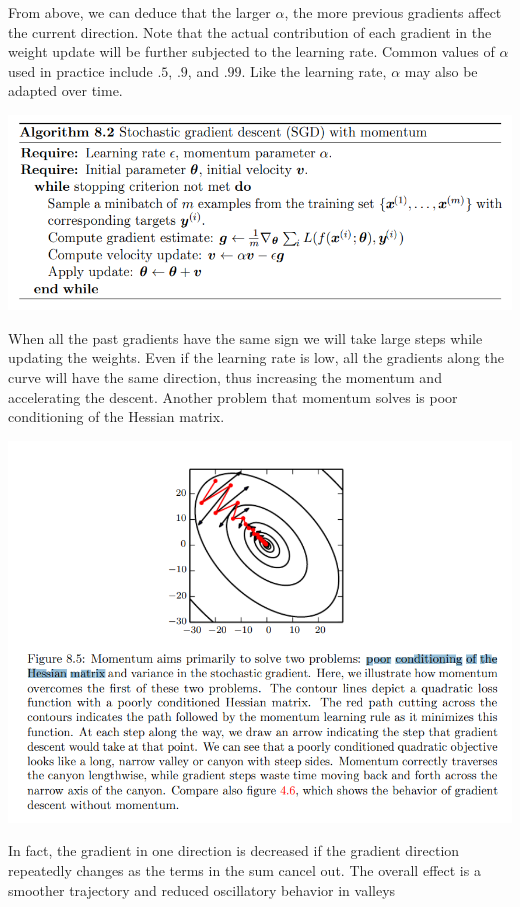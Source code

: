 From above, we can deduce that the larger $\alpha$, the more previous gradients affect the current direction. Note that the actual contribution of each gradient in the weight update will be further subjected to the learning rate.\newline\newline
Common values of $\alpha$ used in practice include $.5$, $.9$, and $.99$. Like the learning rate, $\alpha$ may also be adapted over time.
\begin{center}
    \includegraphics[]{images/Momentum alg.png}
\end{center}
When all the past gradients have the same sign we will take large steps while updating the weights. Even if the learning rate is low, all the gradients along the curve will have the same direction, thus increasing the momentum and accelerating the descent.\newline\newline
Another problem that momentum solves is poor conditioning of the Hessian matrix.
\begin{center}
    \includegraphics[]{images/poor cond. momentum.png}
\end{center}
In fact, the gradient in one direction is decreased if the gradient direction repeatedly changes as the terms in the sum cancel out.\newline\newline
The overall effect is a smoother trajectory and reduced oscillatory
behavior in valleys
